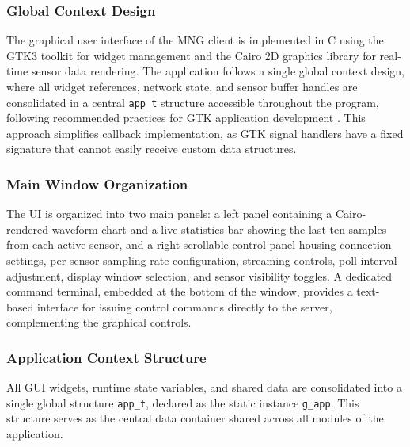 \subsubsection{Global Context Design}
The graphical user interface of the MNG client is implemented in C using the GTK3
toolkit for widget management and the Cairo 2D graphics library for real-time sensor
data rendering. The application follows a single global context design, where all
widget references, network state, and sensor buffer handles are consolidated in a
central \texttt{app\_t} structure accessible throughout the program, following
recommended practices for GTK application development \cite{gtk-documentation}. This
approach simplifies callback implementation, as GTK signal handlers have a fixed
signature that cannot easily receive custom data structures.


\subsubsection{Main Window Organization}
The UI is organized into two main panels: a left panel containing a Cairo-rendered
waveform chart and a live statistics bar showing the last ten samples from each
active sensor, and a right scrollable control panel housing connection settings,
per-sensor sampling rate configuration, streaming controls, poll interval adjustment,
display window selection, and sensor visibility toggles. A dedicated command
terminal, embedded at the bottom of the window, provides a text-based interface for
issuing control commands directly to the server, complementing the graphical
controls.

\subsubsection{Application Context Structure}

All GUI widgets, runtime state variables, and shared data are consolidated
into a single global structure \texttt{app\_t}, declared as the static
instance \texttt{g\_app}. This structure serves as the central data
container shared across all modules of the application.

